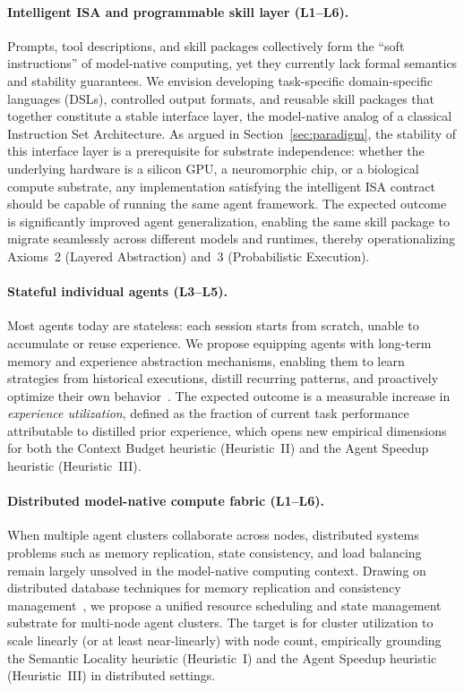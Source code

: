 \paragraph{Intelligent ISA and programmable skill layer (L1--L6).}
Prompts, tool descriptions, and skill packages collectively form the ``soft instructions'' of model-native computing, yet they currently lack formal semantics and stability guarantees.
We envision developing task-specific domain-specific languages (DSLs), controlled output formats, and reusable skill packages that together constitute a stable interface layer, the model-native analog of a classical Instruction Set Architecture.
As argued in Section~\ref{sec:paradigm}, the stability of this interface layer is a prerequisite for substrate independence: whether the underlying hardware is a silicon GPU, a neuromorphic chip, or a biological compute substrate, any implementation satisfying the intelligent ISA contract should be capable of running the same agent framework.
The expected outcome is significantly improved agent generalization, enabling the same skill package to migrate seamlessly across different models and runtimes, thereby operationalizing Axioms~2 (Layered Abstraction) and~3 (Probabilistic Execution).

\paragraph{Stateful individual agents (L3--L5).}
Most agents today are stateless: each session starts from scratch, unable to accumulate or reuse experience.
We propose equipping agents with long-term memory and experience abstraction mechanisms, enabling them to learn strategies from historical executions, distill recurring patterns, and proactively optimize their own behavior~\cite{amem2025,agentmemorysurvey2025}.
The expected outcome is a measurable increase in \textit{experience utilization}, defined as the fraction of current task performance attributable to distilled prior experience, which opens new empirical dimensions for both the Context Budget heuristic (Heuristic~II) and the Agent Speedup heuristic (Heuristic~III).

\paragraph{Distributed model-native compute fabric (L1--L6).}
When multiple agent clusters collaborate across nodes, distributed systems problems such as memory replication, state consistency, and load balancing remain largely unsolved in the model-native computing context.
Drawing on distributed database techniques for memory replication and consistency management~\cite{spanner2012,raft2014}, we propose a unified resource scheduling and state management substrate for multi-node agent clusters.
The target is for cluster utilization to scale linearly (or at least near-linearly) with node count, empirically grounding the Semantic Locality heuristic (Heuristic~I) and the Agent Speedup heuristic (Heuristic~III) in distributed settings.

